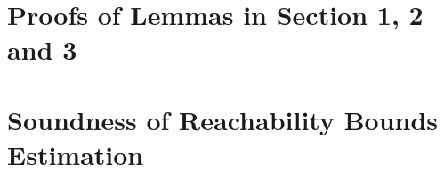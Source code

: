 
\section{Proofs of Lemmas in Section 1, 2 and 3}
\label{apdx:lemma_sec123}

\clearpage
% 
\clearpage
\section{Soundness of Reachability Bounds Estimation}
\label{apdx:reachability_soundness}

\clearpage

